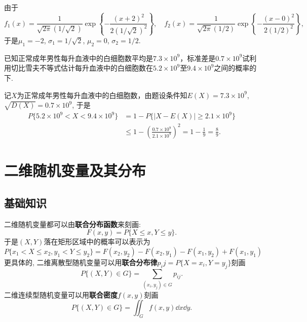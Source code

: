 \documentclass[11pt]{ctexart}
\begin{document}
\begin{solution}
	由于 
	\begin{equation*}
		f_{1}\left(x\right)=\frac{1}{\sqrt{2\pi}\left(1/\sqrt{2}\right)}\exp\left\{-\frac{\left(x+2\right)^{2}}{2\left(1/\sqrt{2}\right)^{2}}\right\}, \quad
		f_{2}\left(x\right)=\frac{1}{\sqrt{2\pi}\left(1/2\right)}\exp\left\{-\frac{\left(x-0\right)^{2}}{2\left(1/2\right)^{2}}\right\}, 
	\end{equation*}
	于是$\mu_1 = -2$, $\sigma_1 = 1/\sqrt{2}$, $\mu_2 = 0$, $\sigma_2 = 1/2$. 
\end{solution}

\begin{example}
	已知正常成年男性每升血液中的白细胞数平均是$7.3 \times 10^9$，标准差是$0.7 \times 10^9$试利用切比雪夫不等式估计每升血液中的白细胞数在$5.2\times 10^9$至$9.4\times 10^9$之间的概率的下.
\end{example}
\begin{solution}
	记$X$为正常成年男性每升血液中的白细胞数，由题设条件知$E(X) = 7.3 \times 10^9$, $\sqrt{D(X)} = 0.7 \times 10^9$, 于是
	\begin{align*}
		P\{5.2\times 10^9< X <9.4\times 10^9\}
		&= 1 - P\{|X - E(X)| \geq 2.1 \times 10^9\} \\		
		&\leq 1 - \left(\frac{0.7 \times 10^9}{2.1 \times 10^9}\right)^2
		= 1- \frac{1}{9} = \frac89. 
	\end{align*}
\end{solution}

\section{二维随机变量及其分布}

\subsection{基础知识}

二维随机变量都可以由\textbf{联合分布函数}来刻画: 
\begin{equation*}
	F(x, y) = P\{X \leq x, Y \leq y\}. 
\end{equation*}
于是$(X, Y)$落在矩形区域中的概率可以表示为
$$
P\{x_{1}<X\leq x_{2},y_{1}<Y\leq y_{2}\}=F(x_{2},y_{2})-F(x_{2},y_{1})-F(x_{1},y_{2})+F(x_{1},y_{1})
$$
更具体的, 二维离散型随机变量可以用\textbf{联合分布律}$p_ij = P\{X = x_i, Y = y_j\}$刻画
\begin{equation*}
	P\{(X,Y) \in G\}
	= \sum_{(x_i, y_j) \in G} p_{ij}. 
\end{equation*} 
二维连续型随机变量可以用\textbf{联合密度}$f(x, y)$刻画
\begin{equation*}
	P\{(X,Y) \in G\}
	= \iint_G f(x, y) \dd x \dd y. 
\end{equation*}
\end{document}
